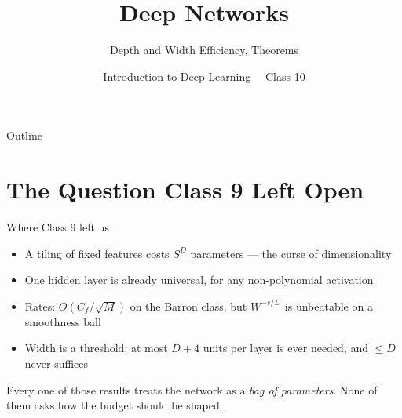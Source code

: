 \documentclass[aspectratio=169, 11pt]{beamer}
\title{Deep Networks}
\subtitle{Depth and Width Efficiency, Theorems}
\author{Introduction to Deep Learning \ \textperiodcentered\ Class 10}
\institute{}
\date{}
\begin{document}
\maketitle

\begin{frame}{Outline}
  \tableofcontents
\end{frame}

\section{The Question Class 9 Left Open}

\begin{frame}{Where Class 9 left us}
  \vspace{0.2em}
  \begin{itemize}\setlength{\itemsep}{4pt}
    \item A tiling of fixed features costs $S^{D}$ parameters --- the
          \alert{curse of dimensionality}
    \item One hidden layer is already \alert{universal}, for any
          non-polynomial activation
    \item Rates: $O(C_f/\sqrt{M})$ on the Barron class, but
          $W^{-s/D}$ is unbeatable on a smoothness ball
    \item \alert{Width is a threshold}: at most $D+4$ units per layer
          is ever needed, and $\leq D$ never suffices
  \end{itemize}
  \vspace{0.4em}
  \begin{redhighlight}
    Every one of those results treats the network as a \emph{bag of
    parameters}. None of them asks how the budget should be
    \alert{shaped}.
  \end{redhighlight}
\end{frame}
\end{document}
